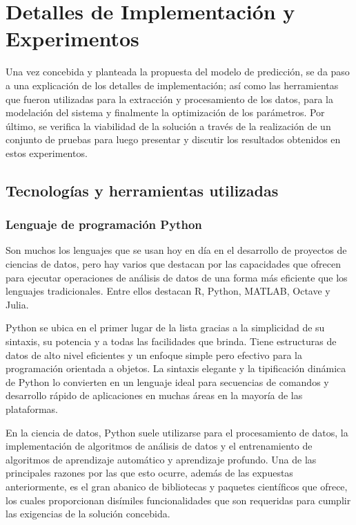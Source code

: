 \chapter{Detalles de Implementación y Experimentos}\label{chapter:implementation}

Una vez concebida y planteada la propuesta del modelo de predicción, se da paso a una explicación de los detalles de implementación; así como las herramientas que fueron utilizadas para la extracción y procesamiento de los datos, para la modelación del sistema y finalmente la optimización de los parámetros. Por último, se verifica la viabilidad de la solución a través de la realización de un conjunto de pruebas para luego presentar y discutir los resultados obtenidos en estos experimentos.

\section{Tecnologías y herramientas utilizadas}

\subsection{Lenguaje de programación Python}

Son muchos los lenguajes que se usan hoy en día en el desarrollo de proyectos de ciencias de datos, pero hay varios que destacan por las capacidades que ofrecen para ejecutar operaciones de análisis de datos de una forma más eficiente que los lenguajes tradicionales. Entre ellos destacan R, Python, MATLAB, Octave y Julia.

Python \cite{python} se ubica en el primer lugar de la lista gracias a la simplicidad de su sintaxis, su potencia y a todas las facilidades que brinda.  Tiene estructuras de datos de alto nivel eficientes y un enfoque simple pero efectivo para la programación orientada a objetos. La sintaxis elegante y la tipificación dinámica de Python lo convierten en un lenguaje ideal para secuencias de comandos y desarrollo rápido de aplicaciones en muchas áreas en la mayoría de las plataformas.

En la ciencia de datos, Python suele utilizarse para el procesamiento de datos, la implementación de algoritmos de análisis de datos y el entrenamiento de algoritmos de aprendizaje automático y aprendizaje profundo. Una de las principales razones por las que esto ocurre, además de las expuestas anteriormente, es el gran abanico de bibliotecas y paquetes científicos que ofrece, los cuales proporcionan disímiles funcionalidades que son requeridas para cumplir las exigencias de la solución concebida. 

